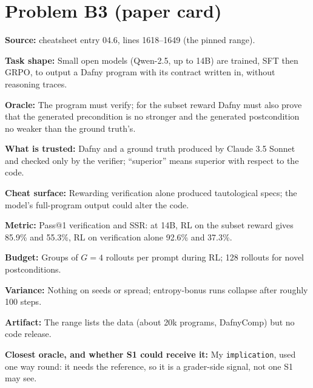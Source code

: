 \documentclass[11pt]{article}
\begin{document}
\section*{Problem B3 (paper card)}\label{ans:B3}
\begin{answer}
\textbf{Source:} cheatsheet entry 04.6, lines 1618--1649 (the pinned range).

\textbf{Task shape:} Small open models (Qwen-2.5, up to 14B) are trained, SFT
then GRPO, to output a Dafny program with its contract written in, without
reasoning traces.

\textbf{Oracle:} The program must verify; for the subset reward Dafny must also
prove that the generated precondition is no stronger and the generated
postcondition no weaker than the ground truth's.

\textbf{What is trusted:} Dafny and a ground truth produced by Claude 3.5
Sonnet and checked only by the verifier; ``superior'' means superior with
respect to the code.

\textbf{Cheat surface:} Rewarding verification alone produced tautological
specs; the model's full-program output could alter the code.

\textbf{Metric:} Pass@1 verification and SSR: at 14B, RL on the subset reward
gives 85.9\% and 55.3\%, RL on verification alone 92.6\% and 37.3\%.

\textbf{Budget:} Groups of $G = 4$ rollouts per prompt during RL; 128 rollouts
for novel postconditions.

\textbf{Variance:} Nothing on seeds or spread; entropy-bonus runs collapse
after roughly 100 steps.

\textbf{Artifact:} The range lists the data (about 20k programs, DafnyComp) but
no code release.

\textbf{Closest oracle, and whether S1 could receive it:} My
\texttt{implication}, used one way round: it needs the reference, so it is a
grader-side signal, not one S1 may see.
\end{answer}

\end{document}
